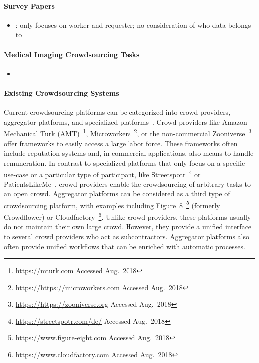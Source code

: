 \documentclass[10pt,twocolumn,letterpaper]{article}
\newcommand{\accessedDate}{Aug.~2018}
\newcommand{\urlfootnote}[1]{~\footnote{\url{#1} Accessed \accessedDate}}
\begin{document}
\paragraph{Survey Papers}
\begin{itemize}
\item \cite{kittur2013future}: only focuses on worker and requester; no consideration of who data belongs to 
\end{itemize}

\paragraph{Medical Imaging Crowdsourcing Tasks}
\begin{itemize}
\item 
\end{itemize}

\paragraph{Existing Crowdsourcing Systems}
Current crowdsourcing platforms can be categorized into crowd providers, aggregator platforms, and specialized platforms~\cite{hossfeld2014best}. %
Crowd providers like Amazon Mechanical Turk (AMT)\urlfootnote{https://mturk.com}, Microworkers\urlfootnote{https://https://microworkers.com}, or the non-commercial Zooniverse\urlfootnote{https://https://zooniverse.org}~\cite{simpson2014zooniverse} offer frameworks to easily access a large labor force. These frameworks often include reputation systems %
and, in commercial applications, also means to handle remuneration. In contrast to specialized platforms that only focus on a specific use-case or a particular type of participant, like Streetspotr\urlfootnote{https://streetspotr.com/de/} or PatientsLikeMe~\cite{frost2008social}, crowd providers enable the crowdsourcing of arbitrary tasks to an open crowd. Aggregator platforms can be considered as a third type of crowdsourcing platform, with examples including Figure~8\urlfootnote{https://www.figure-eight.com} (formerly Crowdflower) or Cloudfactory\urlfootnote{https://www.cloudfactory.com}. Unlike crowd providers, these platforms usually do not maintain their own large crowd. However, they provide a unified interface to several crowd providers who act as subcontractors. Aggregator platforms also often provide unified workflows that can be enriched with automatic processes.
\end{document}
